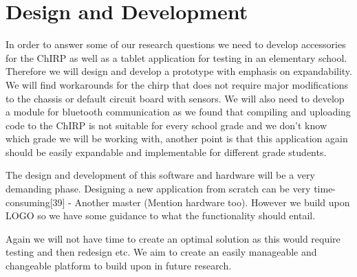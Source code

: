 \section{Design and Development}
In order to answer some of our research questions we need to develop accessories for the ChIRP as well as a tablet application for testing in an elementary school. Therefore we will design and develop a prototype with emphasis on expandability. We will find workarounds for the chirp that does not require major modifications to the chassis or default circuit board with sensors. We will also need to develop a module for bluetooth communication as we found that compiling and uploading code to the ChIRP is not suitable for every school grade and we don't know which grade we will be working with, another point is that this application again should be easily expandable and implementable for different grade students.  

The design and development of this software and hardware will be a very demanding phase. Designing a new application from scratch can be very time-consuming[39] - Another master (Mention hardware too). However we build upon LOGO so we have some guidance to what the functionality should entail. 

Again we will not have time to create an optimal solution as this would require testing and then redesign etc. We aim to create an easily manageable and changeable platform to build upon in future research. 
